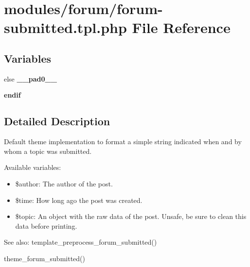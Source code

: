 \hypertarget{forum-submitted_8tpl_8php}{
\section{modules/forum/forum-submitted.tpl.php File Reference}
\label{forum-submitted_8tpl_8php}
}
\subsection*{Variables}
\begin{CompactItemize}
\item 
\hypertarget{forum-submitted_8tpl_8php_8e01dcc96c43199448ee66f7c2ae8ea6}{
else \textbf{\_\-\_\-pad0\_\-\_\-}}
\label{forum-submitted_8tpl_8php_8e01dcc96c43199448ee66f7c2ae8ea6}

\item 
\hypertarget{forum-submitted_8tpl_8php_82cd33ca97ff99f2fcc5e9c81d65251b}{
\textbf{endif}}
\label{forum-submitted_8tpl_8php_82cd33ca97ff99f2fcc5e9c81d65251b}

\end{CompactItemize}


\subsection{Detailed Description}
Default theme implementation to format a simple string indicated when and by whom a topic was submitted.

Available variables:

\begin{itemize}
\item \$author: The author of the post.\item \$time: How long ago the post was created.\item \$topic: An object with the raw data of the post. Unsafe, be sure to clean this data before printing.\end{itemize}


\begin{Desc}
\item[See also:]template\_\-preprocess\_\-forum\_\-submitted() 

theme\_\-forum\_\-submitted() \end{Desc}
